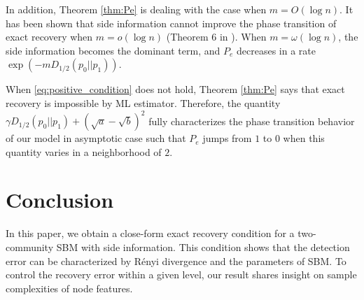 \documentclass[conference]{IEEEtran}
\begin{document}
In addition, Theorem \ref{thm:Pe} is dealing with the case when $m=O(\log n)$. It has been shown
that side information cannot improve the phase transition of exact recovery when $m=o(\log n)$ (Theorem 6 in \cite{saad2018community}). When $m=\omega(\log n)$,
the side information becomes the dominant term, and $P_e$ decreases in a rate $\exp(-m D_{1/2}(p_0||p_1) )$.

When \eqref{eq:positive_condition} does not hold, Theorem \ref{thm:Pe} says that exact recovery is impossible by ML estimator.
Therefore, the quantity $\gamma D_{1/2}(p_0||p_1) + (\sqrt{a} - \sqrt{b})^2$ fully characterizes the 
phase transition behavior of our model in asymptotic case such that $P_e$ jumps from $1$ to $0$ when this quantity varies in a neighborhood of $2$.
\section{Conclusion}\label{s:conclusion}
In this paper, we obtain a close-form exact recovery condition for a two-community SBM with side information. This condition
shows that the detection error can be characterized by Rényi divergence and the parameters of SBM. To control the recovery error within a given level,
our result shares insight on sample complexities of node features.
\end{document}

